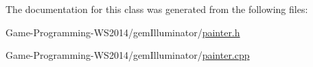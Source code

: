 The documentation for this class was generated from the following files\+:\begin{DoxyCompactItemize}
\item 
Game-\/\+Programming-\/\+W\+S2014/gem\+Illuminator/\hyperlink{painter_8h}{painter.\+h}\item 
Game-\/\+Programming-\/\+W\+S2014/gem\+Illuminator/\hyperlink{painter_8cpp}{painter.\+cpp}\end{DoxyCompactItemize}

